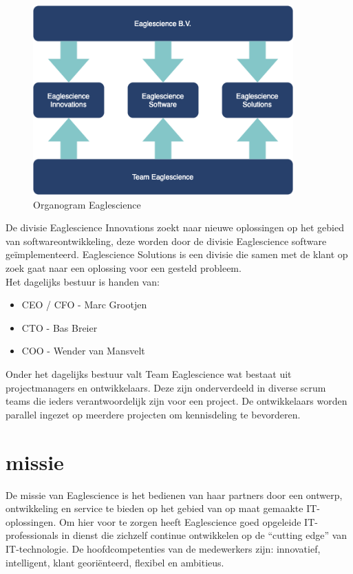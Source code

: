\begin{figure}[bth]
\myfloatalign
\includegraphics[width=10cm]{gfx/organogram}
\caption{Organogram Eaglescience}
\label{fig:Eaglescience organogram}
\end{figure}
De divisie Eaglescience Innovations zoekt naar nieuwe oplossingen op het gebied van softwareontwikkeling, deze worden door de divisie Eaglescience software geïmplementeerd.
Eaglescience Solutions is een divisie die samen met de klant op zoek gaat naar een oplossing voor een gesteld probleem.\\
Het dagelijks bestuur is handen van:
\begin{itemize}
\item CEO / CFO - Marc Grootjen
\item CTO - Bas Breier
\item COO - Wender van Mansvelt
\end{itemize}
Onder het dagelijks bestuur valt Team Eaglescience wat bestaat uit projectmanagers en ontwikkelaars.
Deze zijn onderverdeeld in diverse scrum teams die ieders verantwoordelijk zijn voor een project.
De ontwikkelaars worden parallel ingezet op meerdere projecten om kennisdeling te bevorderen.

\section{missie}\label{sec:missie}
De missie van Eaglescience is het bedienen van haar partners door een ontwerp, ontwikkeling en service te bieden op het gebied van op maat gemaakte IT-oplossingen.
Om hier voor te zorgen heeft Eaglescience goed opgeleide IT-professionals in dienst die zichzelf continue ontwikkelen op de “cutting edge” van IT-technologie.
De hoofdcompetenties van de medewerkers zijn: innovatief, intelligent, klant georiënteerd, flexibel en ambitieus.

